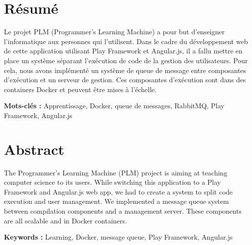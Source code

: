 \documentclass[stage]{tnreport}
\begin{document}
\cleardoublepage
\thispagestyle{empty}

\section*{Résumé}
Le projet PLM (Programmer's Learning Machine) a pour but d'enseigner l'informatique aux personnes qui l'utilisent. Dans le cadre du développement web de cette application utilisant Play Framework et Angular.js, il a fallu mettre en place un système séparant l'exécution de code de la gestion des utilisateurs. Pour cela, nous avons implémenté un système de queue de message entre composantes d'exécution et un serveur de gestion. Ces composantes d'exécution sont dans des containers Docker et peuvent être mises à l'échelle.

{\bf Mots-clés :} Apprentissage, Docker, queue de messages, RabbitMQ, Play Framework, Angular.js


\section*{Abstract}
The Programmer's Learning Machine (PLM) project is aiming at teaching computer science to its users. While switching this application to a Play Framework and Angular.js web app, we had to create a system to split code execution and user management. We implemented a message queue system between compilation components and a management server. These components are all scalable and in Docker containers.

{\bf Keywords :} Learning, Docker, message queue, Play Framework, Angular.js
\end{document}
